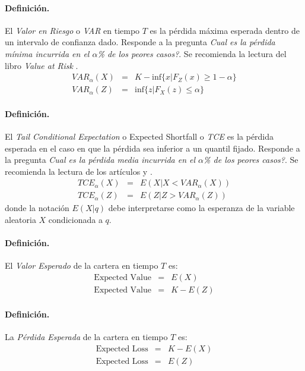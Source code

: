 \paragraph{Definici\'on.} El \emph{Valor en Riesgo} o
\emph{VAR} en tiempo $T$ es la p\'erdida m\'axima esperada dentro
de un intervalo de confianza dado. Responde a la pregunta \emph{Cual es la
p\'erdida m\'inima incurrida en el $\alpha$\% de los peores casos?}. Se recomienda
la lectura del libro \emph{Value at Risk} \cite{var:jorion}.
\begin{eqnarray}
VAR_{\alpha}(X) & = & K - \textrm{inf}\{x | F_Z(x) \geq 1-\alpha \} \nonumber \\
VAR_{\alpha}(Z) & = & \textrm{inf}\{z | F_X(z) \leq \alpha \} \nonumber
\end{eqnarray}

\paragraph{Definici\'on.} El \emph{Tail Conditional Expectation} o Expected
Shortfall o
\emph{TCE} es la p\'erdida esperada en el caso en que la p\'erdida
sea inferior a un quantil fijado.
Responde a la pregunta \emph{Cual es la p\'erdida media incurrida en el
$\alpha$\% de los peores casos?}. Se recomienda la lectura de los art\'iculos
\cite{var:varbad} y \cite{var:eshortfall}.
\begin{eqnarray}
TCE_{\alpha}(X) & = & E(X | X < VAR_{\alpha}(X)) \nonumber \\
TCE_{\alpha}(Z) & = & E(Z | Z > VAR_{\alpha}(Z)) \nonumber
\end{eqnarray}
donde la notaci\'on $E(X|q)$ debe interpretarse como la esperanza de la variable
aleatoria $X$ condicionada a $q$.

\paragraph{Definici\'on.} El \emph{Valor Esperado} de
la cartera en tiempo $T$ es:
\begin{eqnarray}
\textrm{Expected Value} & = & E(X) \nonumber \\
\textrm{Expected Value} & = & K - E(Z) \nonumber
\end{eqnarray}

\paragraph{Definici\'on.} La \emph{P\'erdida Esperada}
de la cartera en tiempo $T$ es:
\begin{eqnarray}
\textrm{Expected Loss} & = & K - E(X) \nonumber \\
\textrm{Expected Loss} & = & E(Z) \nonumber
\end{eqnarray}

